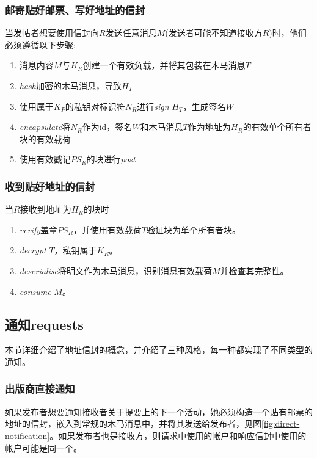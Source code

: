 \subsubsection{邮寄贴好邮票、写好地址的信封}

当发帖者想要使用信封向$R$发送任意消息$M$(发送者可能不知道接收方$R$)时，他们必须遵循以下步骤:

\begin{enumerate}
\item 消息内容$M$与$K_R$创建一个有效负载，并将其包装在木马消息$T$
\item \emph{hash}加密的木马消息，导致$H_T$
\item 使用属于$K_P$的私钥对标识符$N_R$进行\emph{sign} $H_T$，生成签名$W$
\item \emph{encapsulate}将$N_R$作为id，签名$W$和木马消息$T$作为地址为$H_R$的有效单个所有者块的有效载荷
\item 使用有效戳记$PS_R$的块进行\emph{post}
\end{enumerate}

\subsubsection{收到贴好地址的信封}

当$R$接收到地址为$H_R$的块时

\begin{enumerate}
\item \emph{verify}盖章$PS_R$，并使用有效载荷$T$验证块为单个所有者块。
\item \emph{decrypt} $T$，私钥属于$K_R$。
\item \emph{deserialise}将明文作为木马消息，识别消息有效载荷$M$并检查其完整性。
\item \emph{consume} $M$。
\end{enumerate}

\subsection{通知requests\statusgreen}\label{sec:notification-requests} 


本节详细介绍了地址信封的概念，并介绍了三种风格，每一种都实现了不同类型的通知。

\subsubsection{出版商直接通知}

如果发布者想要通知接收者关于提要上的下一个活动，她必须构造一个贴有邮票的地址的信封，嵌入到常规的木马消息中，并将其发送给发布者，见图\ref{fig:direct-notification}。如果发布者也是接收方，则请求中使用的帐户和响应信封中使用的帐户可能是同一个。


